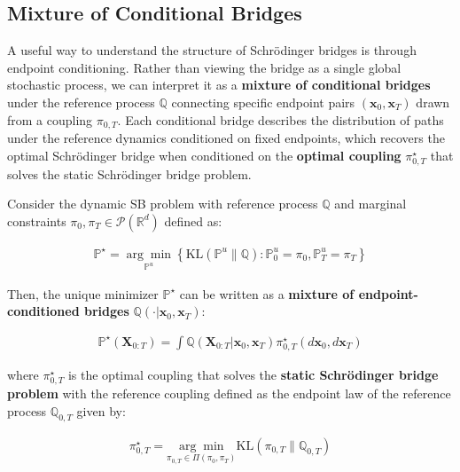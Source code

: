 \documentclass{article}
\begin{document}
\subsection{Mixture of Conditional Bridges}
\label{subsect:mixture-bridges}
A useful way to understand the structure of Schrödinger bridges is through endpoint conditioning. Rather than viewing the bridge as a single global stochastic process, we can interpret it as a \textbf{mixture of conditional bridges} under the reference process $\mathbb{Q}$ connecting specific endpoint pairs $(\boldsymbol{x}_0, \boldsymbol{x}_T)$ drawn from a coupling $\pi_{0,T}$. Each conditional bridge describes the distribution of paths under the reference dynamics conditioned on fixed endpoints, which recovers the optimal Schrödinger bridge when conditioned on the \textbf{optimal coupling} $\pi^\star_{0,T}$ that solves the static Schrödinger bridge problem. 

\begin{proposition}\label{prop:mixture-of-bridges}
    Consider the dynamic SB problem with reference process $\mathbb{Q}$ and marginal constraints $\pi_0,\pi_T\in \mathcal{P}(\mathbb{R}^d)$ defined as:
    \begin{small}
    \begin{align}
        \mathbb{P}^\star=\underset{\mathbb{P}^u}{\arg\min}\left\{\text{KL}\left(\mathbb{P}^u\|\mathbb{Q}\right):\mathbb{P}^u_0=\pi_0, \mathbb{P}^u_T=\pi_T\right\}
    \end{align}
    \end{small}
    Then, the unique minimizer $\mathbb{P}^\star$ can be written as a \textbf{mixture of endpoint-conditioned bridges} $\mathbb{Q}(\cdot|\boldsymbol{x}_0, \boldsymbol{x}_T)$:
    \begin{small}
    \begin{align}
        \mathbb{P}^\star(\boldsymbol{X}_{0:T})=\int\mathbb{Q}(\boldsymbol{X}_{0:T}|\boldsymbol{x}_0, \boldsymbol{x}_T)\pi^\star_{0,T}(d\boldsymbol{x}_0,d\boldsymbol{x}_T)\tag{Mixture of Bridges}\label{eq:mixture-of-bridge}
    \end{align}
    \end{small}
    where $\pi^\star_{0,T}$ is the optimal coupling that solves the \textbf{static Schrödinger bridge problem} with the reference coupling defined as the endpoint law of the reference process $\mathbb{Q}_{0,T}$ given by:
    \begin{small}
    \begin{align}
        \pi^\star_{0,T}=\underset{\pi_{0,T}\in \Pi(\pi_0, \pi_T)}{\arg\min}\text{KL}(\pi_{0,T}\|\mathbb{Q}_{0,T})
    \end{align}
    \end{small}
\end{proposition}
\end{document}
